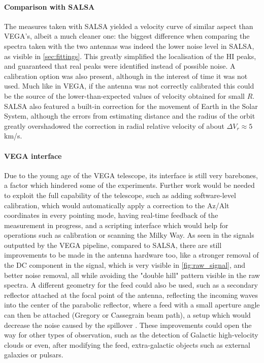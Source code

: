 \paragraph{Comparison with SALSA}
The measures taken with SALSA yielded a velocity curve of similar aspect than VEGA's, albeit a much cleaner one:
the biggest difference when comparing the spectra taken with the two antennas was indeed the lower noise level in SALSA, as visible in \autoref{sec:fittings}. 
This greatly simplified the localisation of the HI peaks, and guaranteed that real peaks were identified instead of possible noise.
A calibration option was also present, although in the interest of time it was not used. Much like in VEGA, if the antenna was not correctly calibrated this could be the source of the lower-than-expected values of velocity obtained for small $R$. 
SALSA also featured a built-in correction for the movement of Earth in the Solar System, although the errors from estimating distance and the radius of the orbit greatly overshadowed the correction in radial relative velocity of about $\Delta V_r \approx 5$ km/s.



\paragraph{VEGA interface}
Due to the young age of the VEGA telescope, its interface is still very barebones, a factor which hindered some of the experiments. Further work would be needed to exploit the full capability of the telescope, such as adding software-level calibration, which would automatically apply a correction to the Az/Alt coordinates in every pointing mode, having real-time feedback of the measurement in progress, and a scripting interface which would help for operations such as calibration or scanning the Milky Way. As seen in the signals outputted by the VEGA pipeline, compared to SALSA, there are still improvements to be made in the antenna hardware too, like a stronger removal of the DC component in the signal, which is very visible in \autoref{fig:raw_signal}, and better noise removal, all while avoiding the "double hill" pattern visible in the raw spectra. 
A different geometry for the feed could also be used, such as a secondary reflector attached at the focal point of the antenna, reflecting the incoming waves into the center of the parabolic reflector, where a feed with a small aperture angle can then be attached (Gregory or Cassegrain
beam path), a setup which would decrease the noise caused by the spillover \cite{lauterbach_radio_2022}.
These improvements could open the way for other types of observation, such as the detection of Galactic high-velocity clouds or even, after modifying the feed,  extra-galactic objects such as external galaxies or pulsars. 